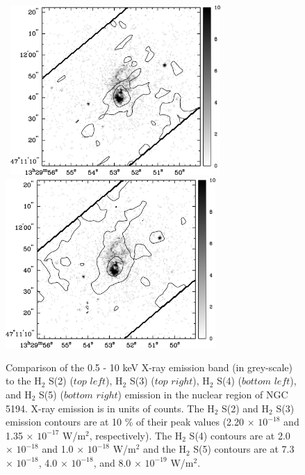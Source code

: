 \documentclass[manuscript]{aastex}
\begin{document}
\begin{figure}[!h]
\centerline{\hbox{\hspace{0.0in}
\includegraphics[width=8cm,angle=0]{bw_x_v_h2s4.jpg}
\hspace{0.1in}
\includegraphics[width=8cm,angle=0]{bw_x_v_h2s5.jpg}}}
\caption{Comparison of the 0.5 - 10 keV X-ray emission band (in grey-scale) to the $\mathrm{H_2}$ S(2) ($top$ $left$), $\mathrm{H_2}$ S(3) ($top$ $right$), $\mathrm{H_2}$ S(4) ($bottom$ $left$), and $\mathrm{H_2}$ S(5) ($bottom$ $right$) emission in the nuclear region of NGC 5194.  X-ray emission is in units of counts.  The $\mathrm{H_2}$ S(2) and $\mathrm{H_2}$ S(3) emission contours are at 10 \% of their peak values (2.20 $\times$ ${10^{-18}}$ and 1.35 $\times$ ${10^{-17}}$ W/$\mathrm{m^2}$, respectively).  The $\mathrm{H_2}$ S(4) contours are at  2.0 $\times$ ${10^{-18}}$ and 1.0 $\times$ ${10^{-18}}$ W/$\mathrm{m^2}$ and the $\mathrm{H_2}$ S(5) contours are at 7.3 $\times$ ${10^{-18}}$, 4.0 $\times$ ${10^{-18}}$, and 8.0 $\times$ ${10^{-19}}$ W/$\mathrm{m^2}$.\label{fig11}}
\end{figure}


\clearpage
\end{document}
